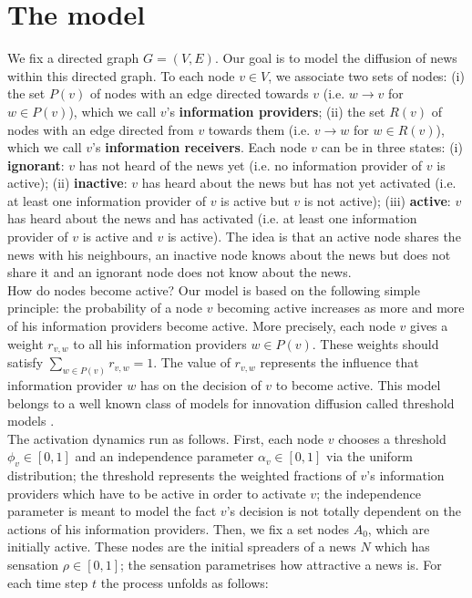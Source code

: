 \documentclass[10pt]{article}
\begin{document}
\section{The model}
We fix a directed graph $G = (V,E)$. Our goal is to model the diffusion of news within this directed graph. To each node $v \in V$, we associate two sets of nodes: (i) the set $P(v)$ of nodes with an edge directed towards $v$ (i.e. $w \rightarrow v$ for $w \in P(v)$), which we call $v$'s \textbf{information providers}; (ii) the set $R(v)$ of nodes with an edge directed from $v$ towards them (i.e. $v \rightarrow w$ for $w \in R(v)$), which we call $v$'s \textbf{information receivers}. Each node $v$ can be in three states:  (i) \textbf{ignorant}: $v$ has not heard of the news yet (i.e. no information provider of $v$ is active); (ii) \textbf{inactive}:  $v$ has heard about the news but has not yet activated (i.e. at least one information provider of $v$ is active but $v$ is not active); (iii) \textbf{active}: $v$ has heard about the news and has activated  (i.e. at least one information provider of $v$ is active and $v$ is active). 
The idea is that an active node shares the news with his neighbours, an inactive node knows about the news but does not share it and an ignorant node does not know about the news. \\

How do nodes become active? Our model is based on the following simple principle: the probability of a node $v$ becoming active increases as more and more of his information providers become active. More precisely, each node $v$ gives a weight $r_{v,w}$ to all his information providers $w \in P(v)$. These weights should satisfy $\sum_{w \in P(v)} r_{v,w} = 1$. The value of $r_{v,w}$ represents the influence that information provider $w$ has on the decision of $v$ to become active. This model belongs to a well known class of models for innovation diffusion called threshold models \cite{watts2002simple}. \\

The activation dynamics run as follows. First, each node $v$ chooses a threshold $\phi_v \in [0,1]$ and an independence parameter $\alpha_v \in [0,1]$ via the uniform distribution; the threshold represents the weighted fractions of $v$'s information providers which have to be active in order to activate $v$; the independence parameter is meant to model the fact $v$'s decision is not totally dependent on the actions of his information providers. Then, we fix a set nodes $A_0$, which are initially active. These nodes are the initial spreaders of a news $N$ which has sensation $\rho \in [0,1]$; the sensation parametrises how attractive a news is. For each time step $t$ the process unfolds as follows:
\end{document}
